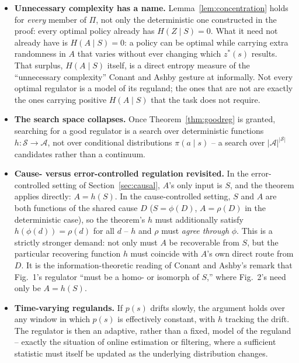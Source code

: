 \documentclass[11pt]{article}
\theoremstyle{definition}
\theoremstyle{remark}
\newcommand{\Scal}{\mathcal{S}}
\newcommand{\Acal}{\mathcal{A}}
\begin{document}
\begin{itemize}
\item \textbf{Unnecessary complexity has a name.} Lemma~\ref{lem:concentration}
holds for \emph{every} member of $\Pi$, not only the deterministic one
constructed in the proof: every optimal policy already has
$H(Z\mid S)=0$. What it need not already have is $H(A\mid S)=0$: a policy
can be optimal while carrying extra randomness in $A$ that varies without
ever changing which $z^\ast(s)$ results. That surplus, $H(A\mid S)$
itself, is a direct entropy measure of the ``unnecessary complexity''
Conant and Ashby gesture at informally. Not every optimal regulator is a
model of its reguland; the ones that are not are exactly the ones
carrying positive $H(A\mid S)$ that the task does not require.

\item \textbf{The search space collapses.} Once Theorem~\ref{thm:goodreg}
is granted, searching for a good regulator is a search over deterministic
functions $h:\Scal\to\Acal$, not over conditional distributions
$\pi(a\mid s)$ -- a search over $|\Acal|^{|\Scal|}$ candidates rather than
a continuum.

\item \textbf{Cause- versus error-controlled regulation revisited.} In the
error-controlled setting of Section~\ref{sec:causal}, $A$'s only input is
$S$, and the theorem applies directly: $A=h(S)$. In the cause-controlled
setting, $S$ and $A$ are both functions of the shared cause $D$
($S=\phi(D)$, $A=\rho(D)$ in the deterministic case), so the theorem's
$h$ must additionally satisfy $h(\phi(d))=\rho(d)$ for all $d$ -- $h$ and
$\rho$ must \emph{agree through} $\phi$. This is a strictly stronger
demand: not only must $A$ be recoverable from $S$, but the particular
recovering function $h$ must coincide with $A$'s own direct route from
$D$. It is the information-theoretic reading of Conant and Ashby's remark
that Fig.~1's regulator ``must be a homo- or isomorph of $S$,'' where
Fig.~2's need only be $A=h(S)$.

\item \textbf{Time-varying regulands.} If $p(s)$ drifts slowly, the
argument holds over any window in which $p(s)$ is effectively constant,
with $h$ tracking the drift. The regulator is then an adaptive, rather
than a fixed, model of the reguland -- exactly the situation of online
estimation or filtering, where a sufficient statistic must itself be
updated as the underlying distribution changes.
\end{itemize}
\end{document}
